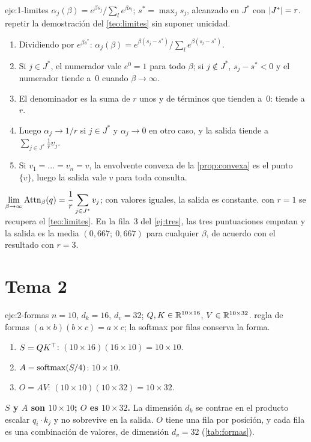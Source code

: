 \begin{solucion}{eje:1-limites}
\datos $\alpha_j(\beta)=e^{\beta s_j}/\sum_le^{\beta s_l}$; $s^{\ast}=\max_js_j$, alcanzado en $J^{\ast}$ con $\lvert J^{\ast}\rvert=r$.
\planteamiento repetir la demostración del \cref{teo:limites} sin suponer unicidad.
\pasos
\begin{enumerate}[label=\arabic*.]
  \item Dividiendo por $e^{\beta s^{\ast}}$: $\alpha_j(\beta)=e^{\beta(s_j-s^{\ast})}/\sum_le^{\beta(s_l-s^{\ast})}$.
  \item Si $j\in J^{\ast}$, el numerador vale $e^{0}=1$ para todo $\beta$; si $j\notin J^{\ast}$, $s_j-s^{\ast}<0$ y el numerador tiende a~0 cuando $\beta\to\infty$.
  \item El denominador es la suma de $r$ unos y de términos que tienden a~0: tiende a $r$.
  \item Luego $\alpha_j\to 1/r$ si $j\in J^{\ast}$ y $\alpha_j\to 0$ en otro caso, y la salida tiende a $\sum_{j\in J^{\ast}}\tfrac1r v_j$.
  \item Si $v_1=\dots=v_n=v$, la envolvente convexa de la \cref{prop:convexa} es el punto $\{v\}$, luego la salida vale $v$ para toda consulta.
\end{enumerate}
\resultado $\displaystyle\lim_{\beta\to\infty}\operatorname{Attn}_\beta(q)=\frac1r\sum_{j\in J^{\ast}}v_j$; con valores iguales, la salida es constante.
\comprobacion con $r=1$ se recupera el \cref{teo:limites}. En la fila~3 del \cref{ej:tres}, las tres puntuaciones empatan y la salida es la media $(0{,}667;\allowbreak\ 0{,}667)$ para cualquier $\beta$, de acuerdo con el resultado con $r=3$.
\end{solucion}

\section{Tema 2}

\begin{solucion}{eje:2-formas}
\datos $n=10$, $d_k=16$, $d_v=32$; $Q,K\in\mathbb{R}^{10\times16}$, $V\in\mathbb{R}^{10\times32}$.
\planteamiento regla de formas $(a\times b)(b\times c)=a\times c$; la softmax por filas conserva la forma.
\pasos
\begin{enumerate}[label=\arabic*.]
  \item $S=QK^{\top}$: $(10\times16)(16\times10)=10\times10$.
  \item $A=\operatorname{softmax}(S/4)$: $10\times10$.
  \item $O=AV$: $(10\times10)(10\times32)=10\times32$.
\end{enumerate}
\resultado \textbf{$S$ y $A$ son $10\times10$; $O$ es $10\times32$.} La dimensión $d_k$ se contrae en el producto escalar $q_i\cdot k_j$ y no sobrevive en la salida.
\comprobacion $O$ tiene una fila por posición, y cada fila es una combinación de valores, de dimensión $d_v=32$ (\cref{tab:formas}).
\end{solucion}


